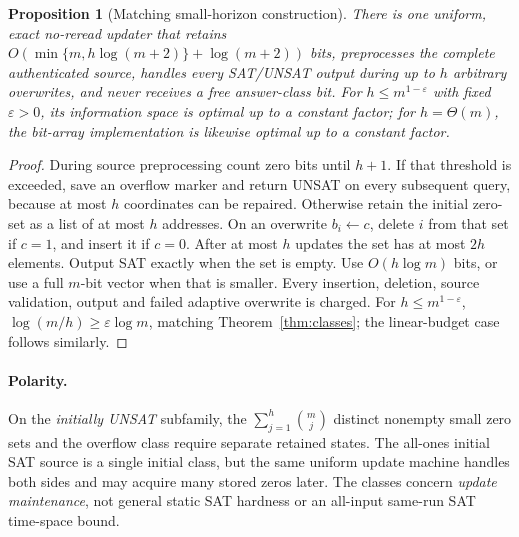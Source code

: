 \documentclass[11pt]{article}
\newtheorem{proposition}[theorem]{Proposition}
\begin{document}
\begin{proposition}[Matching small-horizon construction]\label{prop:cache}
There is one uniform, exact no-reread updater that retains $O(\min\{m,h\log(m+2)\}+\log(m+2))$ bits, preprocesses the complete authenticated source, handles every SAT/UNSAT output during up to $h$ arbitrary overwrites, and never receives a free answer-class bit. For $h\le m^{1-\varepsilon}$ with fixed $\varepsilon>0$, its information space is optimal up to a constant factor; for $h=\Theta(m)$, the bit-array implementation is likewise optimal up to a constant factor.
\end{proposition}
\begin{proof}
During source preprocessing count zero bits until $h+1$. If that threshold is exceeded, save an overflow marker and return UNSAT on every subsequent query, because at most $h$ coordinates can be repaired. Otherwise retain the initial zero-set as a list of at most $h$ addresses. On an overwrite $b_i\gets c$, delete $i$ from that set if $c=1$, and insert it if $c=0$. After at most $h$ updates the set has at most $2h$ elements. Output SAT exactly when the set is empty. Use $O(h\log m)$ bits, or use a full $m$-bit vector when that is smaller. Every insertion, deletion, source validation, output and failed adaptive overwrite is charged. For $h\le m^{1-\varepsilon}$, $\log(m/h)\ge\varepsilon\log m$, matching Theorem~\ref{thm:classes}; the linear-budget case follows similarly.
\end{proof}

\paragraph{Polarity.} On the \emph{initially UNSAT} subfamily, the $\sum_{j=1}^h\binom{m}{j}$ distinct nonempty small zero sets and the overflow class require separate retained states. The all-ones initial SAT source is a single initial class, but the same uniform update machine handles both sides and may acquire many stored zeros later. The classes concern \emph{update maintenance}, not general static SAT hardness or an all-input same-run SAT time-space bound.
\end{document}
